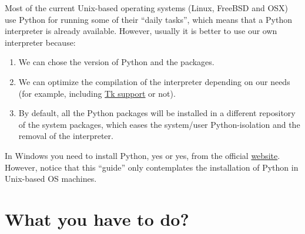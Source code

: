 Most of the current Unix-based operating systems (Linux, FreeBSD and
OSX) use Python for running some of their ``daily tasks'', which means
that a Python interpreter is already available. However, usually it is
better to use our own interpreter because:

\begin{enumerate}

\item We can chose the version of Python and the packages.

\item We can optimize the compilation of the interpreter depending on
  our needs (for example, including
  \href{https://wiki.python.org/moin/TkInter}{Tk support} or not).

\item By default, all the Python packages will be installed in a
  different repository of the system packages, which eases the
  system/user Python-isolation and the removal of the interpreter.

\end{enumerate}

In Windows you need to install Python, yes or yes, from the official
\href{https://www.python.org/downloads/}{website}. However, notice
that this ``guide'' only contemplates the installation of Python in
Unix-based OS machines.

\section{What you have to do?}


